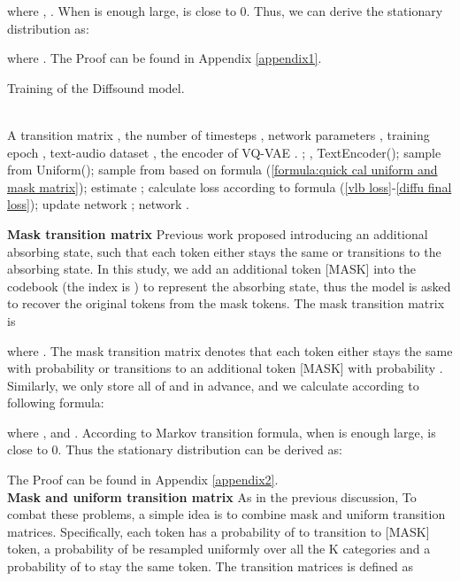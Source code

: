\documentclass[lettersize,journal]{IEEEtran}
\begin{document}
where , .
When  is enough large,  is close to 0. Thus, we can derive the stationary distribution  as:

where .
The Proof can be found in Appendix \ref{appendix1}.
\begin{algorithm}[t]
\caption{Training of the Diffsound model.}
\label{alg:PA1}
\begin{algorithmic}[1]
\REQUIRE ~~\\
    A transition matrix , the number of timesteps , network parameters , training epoch , text-audio dataset , the encoder of VQ-VAE .
    \STATE ;
    \STATE , TextEncoder();
    \STATE sample  from Uniform();
    \STATE sample  from  based on formula (\ref{formula:quick cal uniform and mask matrix});
    \STATE estimate ;
    \STATE calculate loss according to formula (\ref{vlb loss}-\ref{diffu final loss});
    \STATE update network ;
    \ENDFOR
    \ENDFOR
\RETURN network .
\end{algorithmic}
\end{algorithm}

\noindent\textbf{Mask transition matrix} Previous work \cite{hoogeboom2021argmax,gu2021vector} proposed introducing an additional absorbing state, such that each token either stays the same or transitions to the absorbing state. In this study, we add an additional token [MASK] into the codebook (the index is ) to represent the absorbing state, thus the model is asked to recover the original tokens from the mask tokens. The mask transition matrix  is

\noindent where . The mask transition matrix denotes that each token either stays the same with probability  or transitions to an additional token [MASK] with probability . Similarly, we only store all of  and  in advance, and we calculate  according to following formula:

where , and .
According to Markov transition formula, when  is enough large,  is close to 0. Thus the stationary distribution  can be derived as:

The Proof can be found in Appendix \ref{appendix2}. \\
\textbf{Mask and uniform transition matrix} As in the previous discussion, {\color{black}{we speculate that using the uniform transition matrix brings the reverse process is hard to learn. Using the mask transition matrix may make the model tend to focus on the mask token and ignore the context information.}} To combat these problems, a simple idea is to combine mask and uniform transition matrices. Specifically, each token has a probability of  to transition to [MASK] token, a probability of  be resampled uniformly over all the K categories and a probability of  to stay the same token. The transition matrices  is defined as
\end{document}
